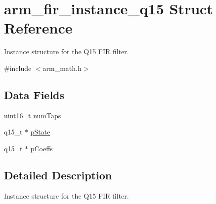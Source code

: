\hypertarget{structarm__fir__instance__q15}{\section{arm\-\_\-fir\-\_\-instance\-\_\-q15 Struct Reference}
\label{structarm__fir__instance__q15}
}


Instance structure for the Q15 F\-I\-R filter.  




{\ttfamily \#include $<$arm\-\_\-math.\-h$>$}

\subsection*{Data Fields}
\begin{DoxyCompactItemize}
\item 
uint16\-\_\-t \hyperlink{structarm__fir__instance__q15_a751941891e47f522a7f5375fe8990aac}{num\-Taps}
\item 
q15\-\_\-t $\ast$ \hyperlink{structarm__fir__instance__q15_ae29dfdb736374fcddaeaec4b7770170c}{p\-State}
\item 
q15\-\_\-t $\ast$ \hyperlink{structarm__fir__instance__q15_a7ca181a37f714d174445f486bebce26f}{p\-Coeffs}
\end{DoxyCompactItemize}


\subsection{Detailed Description}
Instance structure for the Q15 F\-I\-R filter. 

